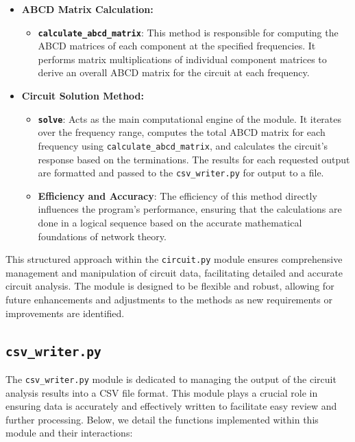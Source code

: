 \documentclass[conference]{IEEEtran}
\begin{document}
\begin{itemize}
      \item \textbf{ABCD Matrix Calculation:}
            \begin{itemize}
                  \item \textbf{\texttt{calculate\_abcd\_matrix}}: This method is responsible for computing the ABCD matrices of each component
                        at the specified frequencies. It performs matrix multiplications of individual component matrices to derive an overall ABCD
                        matrix for the circuit at each frequency.
            \end{itemize}

      \item \textbf{Circuit Solution Method:}
            \begin{itemize}
                  \item \textbf{\texttt{solve}}: Acts as the main computational engine of the module. It iterates over the frequency range,
                        computes the total ABCD matrix for each frequency using \texttt{calculate\_abcd\_matrix}, and calculates the circuit's response
                        based on the terminations. The results for each requested output are formatted and passed to the \texttt{csv\_writer.py} for
                        output to a file.
                  \item \textbf{Efficiency and Accuracy}: The efficiency of this method directly influences the program's performance, ensuring
                        that the calculations are done in a logical sequence based on the accurate mathematical foundations of network theory.
            \end{itemize}
\end{itemize}

This structured approach within the \texttt{circuit.py} module ensures comprehensive management and manipulation of circuit data,
facilitating detailed and accurate circuit analysis. The module is designed to be flexible and robust, allowing for future enhancements
and adjustments to the methods as new requirements or improvements are identified.

\subsection{\textbf{\texttt{csv\_writer.py}}}
The \texttt{csv\_writer.py} module is dedicated to managing the output of the circuit analysis results into a CSV file format. This
module plays a crucial role in ensuring data is accurately and effectively written to facilitate easy review and further processing.
Below, we detail the functions implemented within this module and their interactions:
\end{document}
